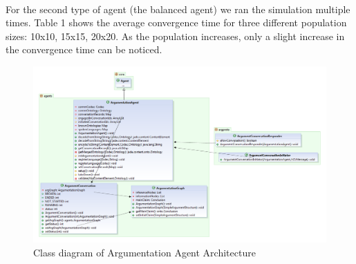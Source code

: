 \documentclass[twoside, 11pt, a4paper]{article}
\begin{document}
\paragraph*{}For the second type of agent (the balanced agent) we ran the simulation multiple times. Table 1 shows the average convergence time for three different population sizes: 10x10, 15x15, 20x20. As the population increases, only a slight increase in the convergence time can be noticed.



\begin{figure}[htp]
		\centering
		\includegraphics[width=\textwidth]{ArgumentationAgentArchitecture}
		\caption{Class diagram of Argumentation Agent Architecture}
		\label{Fig 1}
\end{figure}


\vskip 0.2in


\end{document}
